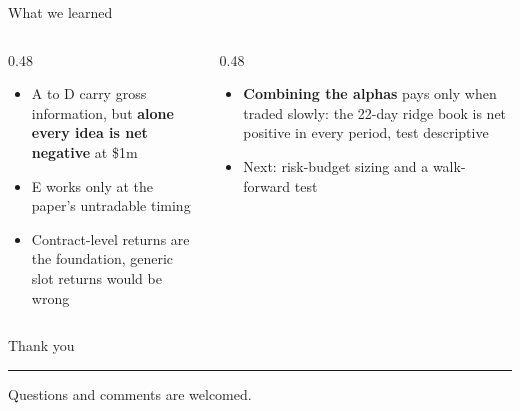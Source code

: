 \documentclass[10pt, aspectratio=169]{beamer}
\newcommand{\key}[1]{\textcolor{accent}{\textbf{#1}}}
\begin{document}
\begin{frame}{What we learned}
\begin{table}
\centering
\scriptsize
\renewcommand{\arraystretch}{0.9}
\setlength{\tabcolsep}{3pt}

\caption{One engine, \$1m, equal $1/N$, full sample 1986--2026, $t+1$ fill.
Annualized return in percent, annualized Sharpe in parentheses, turnover per year.
A's engine gross is below its signal-level $+0.63\%$ because positions follow the
signal through a 25\% band.}
\end{table}
\begin{columns}[T, onlytextwidth]
\begin{column}{0.48\textwidth}
\footnotesize
\begin{itemize}
  \item A to D carry gross information, but \key{alone every idea is net
        negative} at \$1m
  \item E works only at the paper's untradable timing
  \item Contract-level returns are the foundation, generic slot returns
        would be wrong
\end{itemize}
\end{column}
\begin{column}{0.48\textwidth}
\footnotesize
\begin{itemize}
  \item \key{Combining the alphas} pays only when traded slowly: the 22-day
        ridge book is net positive in every period, test descriptive
  \item Next: risk-budget sizing and a walk-forward test
\end{itemize}
\end{column}
\end{columns}
\end{frame}
\begin{frame}[plain]
\vfill
\centering
{\Huge\color{navy}Thank you}
\par\vspace{2.5ex}
{\color{accent}\rule{0.18\linewidth}{0.6pt}}
\par\vspace{2.5ex}
{\large\color{slate}Questions and comments are welcomed.}
\vfill
\end{frame}

\appendix
\end{document}
